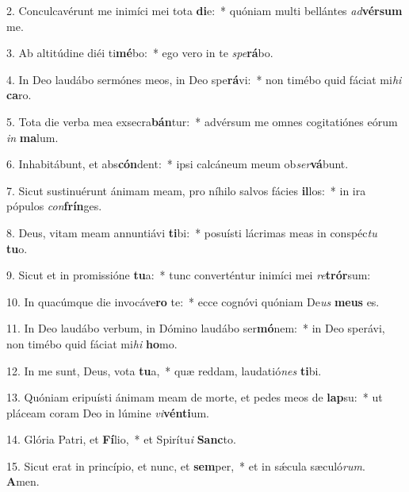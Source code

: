 2. Conculcavérunt me inimíci mei tota \textbf{di}e:~*  quóniam multi bellántes \textit{ad}\textbf{vér}\textbf{sum} me.\

3. Ab altitúdine diéi ti\textbf{mé}bo:~*  ego vero in te \textit{spe}\textbf{rá}bo.\

4. In Deo laudábo sermónes meos, in Deo spe\textbf{rá}vi:~*  non timébo quid fáciat mi\textit{hi} \textbf{ca}ro.\

5. Tota die verba mea exsecra\textbf{bán}tur:~*  advérsum me omnes cogitatiónes eórum \textit{in} \textbf{ma}lum.\

6. Inhabitábunt, et abs\textbf{cón}dent:~*  ipsi calcáneum meum ob\textit{ser}\textbf{vá}bunt.\

7. Sicut sustinuérunt ánimam meam, pro níhilo salvos fácies \textbf{il}los:~*  in ira pópulos \textit{con}\textbf{frín}ges.\

8. Deus, vitam meam annuntiávi \textbf{ti}bi:~*  posuísti lácrimas meas in conspéc\textit{tu} \textbf{tu}o.\

9. Sicut et in promissióne \textbf{tu}a:~*  tunc converténtur inimíci mei \textit{re}\textbf{trór}sum:\

10. In quacúmque die invocáve\textbf{ro} te:~*  ecce cognóvi quóniam De\textit{us} \textbf{me}\textbf{us} es.\

11. In Deo laudábo verbum, in Dómino laudábo ser\textbf{mó}nem:~*  in Deo sperávi, non timébo quid fáciat mi\textit{hi} \textbf{ho}mo.\

12. In me sunt, Deus, vota \textbf{tu}a,~*  quæ reddam, laudatió\textit{nes} \textbf{ti}bi.\

13. Quóniam eripuísti ánimam meam de morte, et pedes meos de \textbf{lap}su:~*  ut pláceam coram Deo in lúmine \textit{vi}\textbf{vén}\textbf{ti}um.\

14. Glória Patri, et \textbf{Fí}lio,~*  et Spirítu\textit{i} \textbf{Sanc}to.\

15. Sicut erat in princípio, et nunc, et \textbf{sem}per,~*  et in sǽcula sæculó\textit{rum}. \textbf{A}men.\

